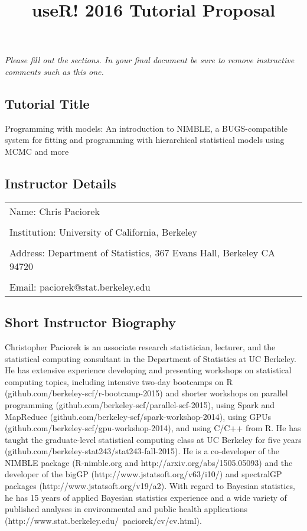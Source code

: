 \documentclass[]{article}
\title{useR! 2016 Tutorial Proposal}
\author{}
\date{}
\begin{document}
\maketitle

\emph{Please fill out the sections. In your final document be sure to
remove instructive comments such as this one.}

\subsection{Tutorial Title}\label{tutorial-title}

Programming with models: An introduction to NIMBLE, a BUGS-compatible system for fitting and programming with hierarchical statistical models using MCMC and more

\subsection{Instructor Details}\label{instructor-details}

\begin{longtable}[c]{@{}ll@{}}
\toprule
Name: Chris Paciorek &\tabularnewline
&\tabularnewline
Institution: University of California, Berkeley&\tabularnewline
&\tabularnewline
Address: Department of Statistics, 367 Evans Hall, Berkeley CA 94720 &\tabularnewline
&\tabularnewline
Email: paciorek@stat.berkeley.edu &\tabularnewline
\bottomrule
\end{longtable}

\subsection{Short Instructor
Biography}\label{short-instructor-biography}

Christopher Paciorek is an associate research statistician, lecturer, and the statistical computing consultant in the Department of Statistics at UC Berkeley. He has extensive experience developing and presenting workshops on statistical computing topics, including intensive two-day bootcamps on R (github.com/berkeley-scf/r-bootcamp-2015) and  shorter workshops on parallel programming (github.com/berkeley-scf/parallel-scf-2015), using Spark and MapReduce (github.com/berkeley-scf/spark-workshop-2014), using GPUs (github.com/berkeley-scf/gpu-workshop-2014), and using C/C++ from R. He has taught the graduate-level statistical computing class at UC Berkeley for five years (github.com/berkeley-stat243/stat243-fall-2015). He is a co-developer of the NIMBLE package (R-nimble.org and http://arxiv.org/abs/1505.05093) and the developer of the bigGP (http://www.jstatsoft.org/v63/i10/) and spectralGP packages (http://www.jstatsoft.org/v19/a2). With regard to Bayesian statistics, he has 15 years of applied Bayesian statistics experience and a wide variety of published analyses in environmental and public health applications (http://www.stat.berkeley.edu/~paciorek/cv/cv.html). 
\end{document}
